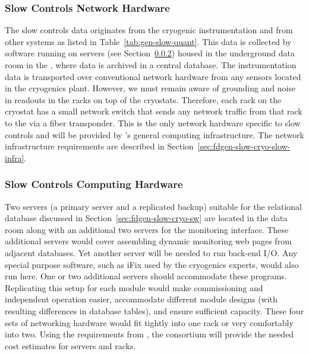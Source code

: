 \subsubsection{Slow Controls Network Hardware}
\label{sec:fdgen-slow-cryo-slow-network}
The slow controls data originates from the cryogenic instrumentation and from other systems as listed in Table~\ref{tab:gen-slow-quant}. This data is collected by software running on servers
(see Section~\ref{sec:fdgen-slow-cryo-slow-compute})
housed in the underground data room in the ,
where data is archived in a central  database.
The instrumentation data is transported over
conventional network hardware from any sensors located in the cryogenics
plant.  However, we must remain aware of grounding and noise in readouts in the racks on top of the
cryostats.  Therefore, each
rack on the cryostat has a small network switch that sends
any network traffic from that rack to the  via a fiber transponder.
This is the only network hardware specific to slow controls and will be provided by %
's   
general computing infrastructure. %
The network infrastructure requirements are described in
Section~\ref{sec:fdgen-slow-cryo-slow-infra}.

\subsubsection{Slow Controls Computing Hardware}
\label{sec:fdgen-slow-cryo-slow-compute}
Two servers (a primary server and a replicated backup) suitable for the relational database discussed
in Section~\ref{sec:fdgen-slow-cryo-sw} are located in the  data
room along with an additional
two servers for the  monitoring interface. These additional servers would cover assembling dynamic  monitoring web pages from adjacent
databases.  Yet another server will be needed to run back-end I/O.  Any special purpose software, such as iFix used by the cryogenics experts, would
also run here. One or two additional servers should accommodate these programs.
Replicating this setup for each module would make commissioning and independent operation easier, accommodate different module
designs (with resulting differences in database tables), and ensure
sufficient capacity.  These four sets of networking hardware would fit tightly into one rack or very comfortably into two. Using the requirements from , the  consortium will provide the needed cost estimates for servers and racks.



